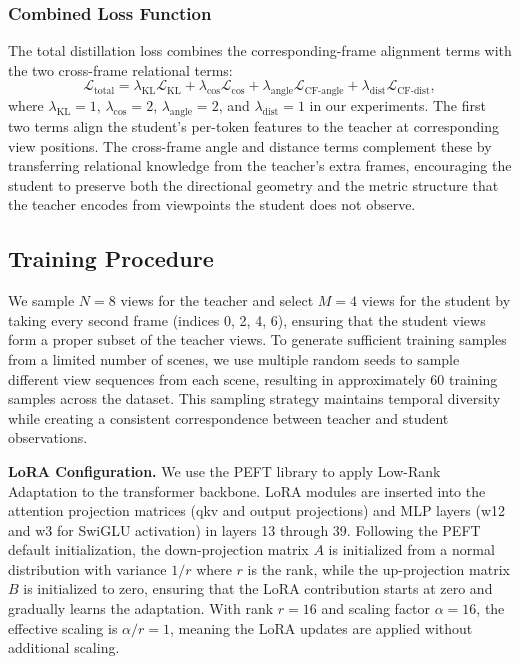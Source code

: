 \subsubsection{Combined Loss Function}

The total distillation loss combines the corresponding-frame alignment terms with the two cross-frame relational terms:
\begin{equation}
\mathcal{L}_{\text{total}} = \lambda_{\text{KL}} \mathcal{L}_{\text{KL}} + \lambda_{\text{cos}} \mathcal{L}_{\text{cos}} + \lambda_{\text{angle}} \mathcal{L}_{\text{CF-angle}} + \lambda_{\text{dist}} \mathcal{L}_{\text{CF-dist}},
\label{eq:total_loss}
\end{equation}
where $\lambda_{\text{KL}} = 1$, $\lambda_{\text{cos}} = 2$, $\lambda_{\text{angle}} = 2$, and $\lambda_{\text{dist}} = 1$ in our experiments. The first two terms align the student's per-token features to the teacher at corresponding view positions. The cross-frame angle and distance terms complement these by transferring relational knowledge from the teacher's extra frames, encouraging the student to preserve both the directional geometry and the metric structure that the teacher encodes from viewpoints the student does not observe.

\subsection{Training Procedure}

We sample $N=8$ views for the teacher and select $M=4$ views for the student by taking every second frame (indices 0, 2, 4, 6), ensuring that the student views form a proper subset of the teacher views. To generate sufficient training samples from a limited number of scenes, we use multiple random seeds to sample different view sequences from each scene, resulting in approximately 60 training samples across the dataset. This sampling strategy maintains temporal diversity while creating a consistent correspondence between teacher and student observations.

\textbf{LoRA Configuration.} We use the PEFT library to apply Low-Rank Adaptation to the transformer backbone. LoRA modules are inserted into the attention projection matrices (qkv and output projections) and MLP layers (w12 and w3 for SwiGLU activation) in layers 13 through 39. Following the PEFT default initialization, the down-projection matrix $A$ is initialized from a normal distribution with variance $1/r$ where $r$ is the rank, while the up-projection matrix $B$ is initialized to zero, ensuring that the LoRA contribution starts at zero and gradually learns the adaptation. With rank $r=16$ and scaling factor $\alpha=16$, the effective scaling is $\alpha/r = 1$, meaning the LoRA updates are applied without additional scaling.

